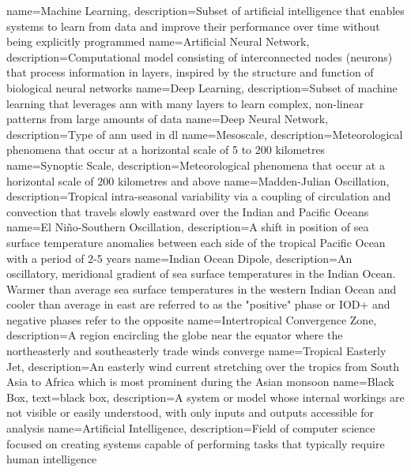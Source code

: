 {
    name=Machine Learning,
    description={Subset of artificial intelligence that enables systems to learn from data and improve their performance over time without being explicitly programmed}
}
{
    name=Artificial Neural Network,
    description={Computational model consisting of interconnected nodes (neurons) that process information in layers, inspired by the structure and function of biological neural networks}
}
{
    name=Deep Learning,
    description={Subset of machine learning that leverages \acrfull{ann} with many layers to learn complex, non-linear patterns from large amounts of data}
}
{
    name=Deep Neural Network,
    description={Type of \acrfull{ann} used in \acrfull{dl}}
}
{
    name=Mesoscale,
    description={Meteorological phenomena that occur at a horizontal scale of 5 to 200 kilometres}
}
{
    name=Synoptic Scale,
    description={Meteorological phenomena that occur at a horizontal scale of 200 kilometres and above}
}
{
    name=Madden-Julian Oscillation,
    description={Tropical intra-seasonal variability via a coupling of circulation and convection that travels slowly eastward over the Indian and Pacific Oceans}
}
{
    name=El Niño-Southern Oscillation,
    description={A shift in position of sea surface temperature anomalies between each side of the tropical Pacific Ocean with a period of 2-5 years}
}
{
    name=Indian Ocean Dipole,
    description={An oscillatory, meridional gradient of sea surface temperatures in the Indian Ocean. Warmer than average sea surface temperatures in the western Indian Ocean and cooler than average in east are referred to as the "positive" phase or IOD+ and negative phases refer to the opposite}
}
{
    name=Intertropical Convergence Zone,
    description={A region encircling the globe near the equator where the northeasterly and southeasterly trade winds converge}
}
{
    name=Tropical Easterly Jet,
    description={An easterly wind current stretching over the tropics from South Asia to Africa which is most prominent during the Asian monsoon}
}
{
    name=Black Box,
    text={black box},
    description={A system or model whose internal workings are not visible or easily understood, with only inputs and outputs accessible for analysis}
}
{
    name=Artificial Intelligence,
    description={Field of computer science focused on creating systems capable of performing tasks that typically require human intelligence}
}

